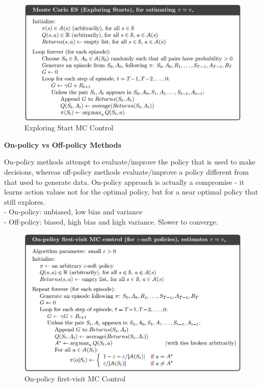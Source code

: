 \documentclass{article}
\begin{document}
\begin{figure}[h]
\includegraphics[scale=0.25]{exploringstart_mc}
\centering
\caption{Exploring Start MC Control}
\end{figure}

\newpage
\noindent
\textbf{On-policy vs Off-policy Methods}

\noindent
On-policy methods attempt to evaluate/improve the policy that is used to make
decisions, whereas off-policy methods evaluate/improve a policy different from
that used to generate data. On-policy approach is actually a compromise - it
learns action values not for the optimal policy, but for a near optimal policy
that still explores.\\
- On-policy: unbiased, low bias and variance\\
- Off-policy: biased, high bias and high variance. Slower to converge.\\

\begin{figure}[h]
\includegraphics[scale=0.4]{onpolicy_firstvisit_mc}
\centering
\caption{On-policy first-visit MC Control}
\end{figure}
\end{document}
